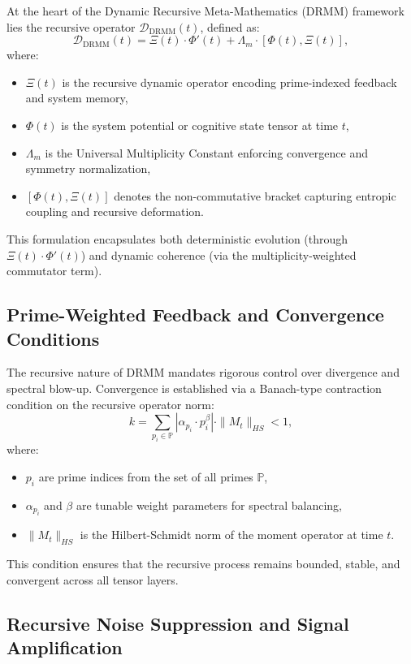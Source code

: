 \documentclass{article}
\theoremstyle{plain}
\begin{document}
At the heart of the Dynamic Recursive Meta-Mathematics (DRMM) framework lies the recursive operator $\mathcal{D}_{\text{DRMM}}(t)$, defined as:
\begin{equation}
\mathcal{D}_{\text{DRMM}}(t) = \Xi(t) \cdot \Phi'(t) + \Lambda_m \cdot [\Phi(t), \Xi(t)],
\end{equation}
where:
\begin{itemize}
    \item $\Xi(t)$ is the recursive dynamic operator encoding prime-indexed feedback and system memory,
    \item $\Phi(t)$ is the system potential or cognitive state tensor at time $t$,
    \item $\Lambda_m$ is the Universal Multiplicity Constant enforcing convergence and symmetry normalization,
    \item $[\Phi(t), \Xi(t)]$ denotes the non-commutative bracket capturing entropic coupling and recursive deformation.
\end{itemize}
This formulation encapsulates both deterministic evolution (through $\Xi(t) \cdot \Phi'(t)$) and dynamic coherence (via the multiplicity-weighted commutator term).

\subsection{Prime-Weighted Feedback and Convergence Conditions}

The recursive nature of DRMM mandates rigorous control over divergence and spectral blow-up. Convergence is established via a Banach-type contraction condition on the recursive operator norm:
\begin{equation}
k = \sum_{p_i \in \mathbb{P}} \left| \alpha_{p_i} \cdot p_i^{\beta} \right| \cdot \|M_t\|_{HS} < 1,
\end{equation}
where:
\begin{itemize}
    \item $p_i$ are prime indices from the set of all primes $\mathbb{P}$,
    \item $\alpha_{p_i}$ and $\beta$ are tunable weight parameters for spectral balancing,
    \item $\|M_t\|_{HS}$ is the Hilbert-Schmidt norm of the moment operator at time $t$.
\end{itemize}
This condition ensures that the recursive process remains bounded, stable, and convergent across all tensor layers.

\subsection{Recursive Noise Suppression and Signal Amplification}
\end{document}

